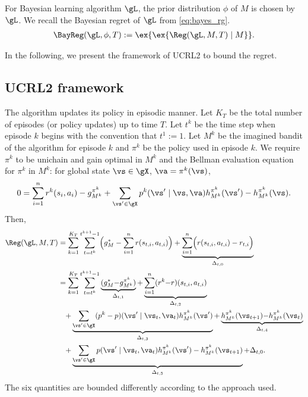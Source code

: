 For Bayesian learning algorithm $\gL$, the prior distribution $\phi$ of $M$ is chosen by  $\gL$.
We recall the Bayesian regret of $\gL$ from \eqref{eq:bayes_rg}.
\begin{align}
    \BayReg(\gL, \phi, T) := \ex{\ex{\Reg(\gL, M, T) \mid M}}.
\end{align}

In the following, we present the framework of UCRL2 to bound the regret.

\subsection{UCRL2 framework}

The algorithm updates its policy in episodic manner. %
Let $K_T$ be the total number of episodes (or policy updates) up to time $T$.
Let $t^k$ be the time step when episode $k$ begins with the convention that $t^1:=1$.
Let $M^k$ be the imagined bandit of the algorithm for episode $k$ and $\pi^k$ be the policy used in episode $k$.
We require $\pi^k$ to be unichain and gain optimal in $M^k$ and the Bellman evaluation equation for $\pi^k$ in $M^k$: for global state $\vs\in\gX$, $\va=\pi^k(\vs)$,
\begin{align*}
    0 =  \sum_{i=1}^nr^k(s_i, a_i) -g^{\pi^k}_{M^k} +\sum_{\vs'\in\gX}p^k(\vs' \mid \vs, \va)h^{\pi^k}_{M^k}(\vs') -h^{\pi^k}_{M^k}(\vs).
\end{align*}
Then,
\begin{align*}
    \Reg(\gL, M, T)
    &= \sum_{k=1}^{K_T}\sum_{t=t^k}^{t^{k+1}-1} \Bigl(g^*_M -\sum_{i=1}^{n}r(s_{t,i},a_{t,i})\Bigr) +\underbrace{\sum_{i=1}^{n}\Bigl(r(s_{t,i},a_{t,i})-r_{t,i}\Bigr)}_{\Delta_{t,0}} \\
    &=\sum_{k=1}^{K_T}\sum_{t=t^k}^{t^{k+1}-1} \underbrace{(g^*_M{-}g^{\pi^k}_{M^k})}_{\Delta_{t,1}} {+}\underbrace{\sum_{i=1}^n(r^k{-}r)(s_{t,i},a_{t,i})}_{\Delta_{t,2}} \\
    &\quad {+}\underbrace{\sum_{\vs'\in\gX}(p^k-p)(\vs' \mid \vs_t, \va_t)h^{\pi^k}_{M^k}(\vs')}_{\Delta_{t,3}} {+}\underbrace{h^{\pi^k}_{M^k}(\vs_{t+1}){-}h^{\pi^k}_{M^k}(\vs_{t})}_{\Delta_{t,4}} \\
    &\quad {+}\underbrace{\sum_{\vs'\in\gX} p(\vs' \mid \vs_t, \va_t)h^{\pi^k}_{M^k}(\vs')-h^{\pi^k}_{M^k}(\vs_{t+1})}_{\Delta_{t,5}} +\Delta_{t,0}.
\end{align*}
The six quantities are bounded differently according to the approach used.

